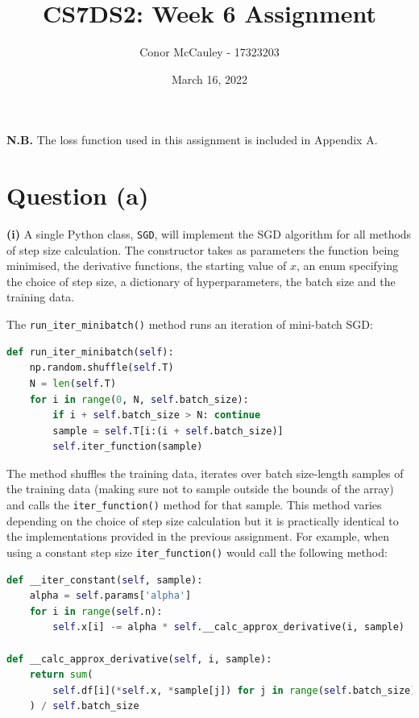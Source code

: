\documentclass[12pt]{article}
\title{CS7DS2: Week 6 Assignment}
\author{Conor McCauley - 17323203}
\date{March 16, 2022}
\begin{document}
\maketitle

\textbf{N.B.} The loss function used in this assignment is included in Appendix A.

\section*{Question (a)}

\noindent \textbf{(i)} A single Python class, \texttt{SGD}, will implement the SGD algorithm for all methods of step size calculation. The constructor takes as parameters the function being minimised, the derivative functions, the starting value of $x$, an enum specifying the choice of step size, a dictionary of hyperparameters, the batch size and the training data.

The \texttt{run\_iter\_minibatch()} method runs an iteration of mini-batch SGD:

\lstset{basicstyle=\footnotesize}
\begin{lstlisting}[language=Python]
def run_iter_minibatch(self):
    np.random.shuffle(self.T)
    N = len(self.T)
    for i in range(0, N, self.batch_size):
        if i + self.batch_size > N: continue
        sample = self.T[i:(i + self.batch_size)]
        self.iter_function(sample)
\end{lstlisting}

The method shuffles the training data, iterates over batch size-length samples of the training data (making sure not to sample outside the bounds of the array) and calls the \texttt{iter\_function()} method for that sample. This method varies depending on the choice of step size calculation but it is practically identical to the implementations provided in the previous assignment. For example, when using a constant step size \texttt{iter\_function()} would call the following method:

\lstset{basicstyle=\footnotesize}
\begin{lstlisting}[language=Python]
def __iter_constant(self, sample):
    alpha = self.params['alpha']
    for i in range(self.n):
        self.x[i] -= alpha * self.__calc_approx_derivative(i, sample)

def __calc_approx_derivative(self, i, sample):
    return sum(
        self.df[i](*self.x, *sample[j]) for j in range(self.batch_size)
    ) / self.batch_size
\end{lstlisting}
\end{document}
